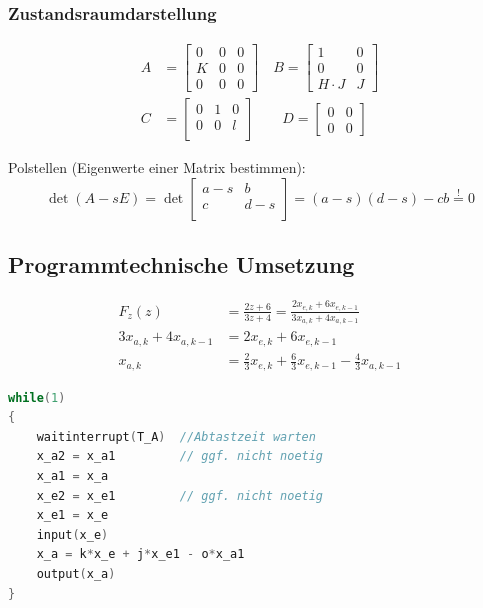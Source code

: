 \vspace{-1em}
\begin{mdframed}[style=exercise]
	\vspace{-1em}
	\subsubsection{Zustandsraumdarstellung}
	\begin{align*}
		A &= \begin{bmatrix}
			0 & 0 & 0 \\
			K & 0 & 0 \\
			0 & 0 & 0
		\end{bmatrix}
		\quad
		B = \begin{bmatrix}
			1         & 0 \\
			0         & 0 \\
			H\cdot{}J & J
		\end{bmatrix} 					\\
		C &= \begin{bmatrix}
			0 & 1 & 0 \\ 
			0 & 0 & l \\
		\end{bmatrix}
		\qquad
		D = \begin{bmatrix}
			0 & 0 \\
			0 & 0
		\end{bmatrix}
	\end{align*}
	
	Polstellen (Eigenwerte einer Matrix bestimmen):
    \[
        \operatorname{det}(A - sE)= \operatorname{det}
		\begin{bmatrix}
			a-s & b \\
			c & d-s \\
		\end{bmatrix} = (a-s)(d-s) - cb \overset{!}{=} 0
    \]
\end{mdframed}

\subsection{Programmtechnische Umsetzung}
\begin{align*}
	F_z(z) &= \frac{2z + 6}{3z + 4} = \frac{2x_{e,k} + 6x_{e,k-1}}{3x_{a,k} + 4x_{a,k-1}}\\
	3x_{a,k} + 4x_{a,k-1} &= 2x_{e,k} + 6x_{e,k-1} \\
	x_{a,k} &= \frac{2}{3}x_{e,k} + \frac{6}{3}x_{e,k-1} - \frac{4}{3}x_{a,k-1}
\end{align*}


\begin{lstlisting}[language=c]
while(1)
{
	waitinterrupt(T_A) 	//Abtastzeit warten
	x_a2 = x_a1			// ggf. nicht noetig
	x_a1 = x_a
	x_e2 = x_e1			// ggf. nicht noetig
	x_e1 = x_e
	input(x_e)
	x_a = k*x_e + j*x_e1 - o*x_a1
	output(x_a)
}
\end{lstlisting}